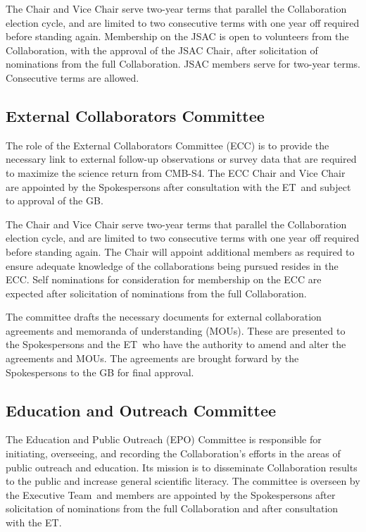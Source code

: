 \documentclass[12pt]{article}
\newcommand{\exec}{{Executive Team}}
\newcommand{\shorte}{{ET}}  %
\newcommand\collabname{CMB-S4}
\begin{document}
The Chair and Vice Chair serve two-year terms that parallel the Collaboration election cycle, and are limited to two consecutive terms with one year off required before standing again. Membership on the JSAC is open to volunteers from the Collaboration, with the approval of the JSAC Chair, after solicitation of nominations from the full Collaboration. JSAC members serve for two-year terms. Consecutive terms are allowed.


\subsection{External Collaborators Committee}

The role of the External Collaborators Committee (ECC) is to provide the necessary link to external follow-up observations or survey data that are required to maximize the science return from \collabname. The ECC Chair and Vice Chair are appointed by the Spokespersons after consultation with the \shorte\ and subject to approval of the GB.  

The Chair and Vice Chair serve two-year terms that parallel the Collaboration election cycle, and are limited to two consecutive terms with one year off required before standing again. The Chair will appoint additional members as required to ensure adequate knowledge of the collaborations being pursued resides in the ECC. Self nominations for consideration for membership on the ECC are expected after solicitation of nominations from the full Collaboration.  

The committee drafts the necessary documents for external collaboration agreements and memoranda of understanding (MOUs). These are presented to the Spokespersons and the \shorte\ who have the authority to amend and alter the agreements and MOUs. The agreements are brought forward by the Spokespersons to the GB for final approval.

\subsection{Education and Outreach Committee}

The Education and Public Outreach (EPO) Committee is responsible for initiating, overseeing, and recording the Collaboration's efforts in the areas of public outreach and education. Its mission is to disseminate Collaboration results to the public and increase general scientific literacy. The committee is overseen by the \exec \ and members are appointed by the Spokespersons after solicitation of nominations from the full Collaboration and after consultation with the \shorte.
\end{document}
